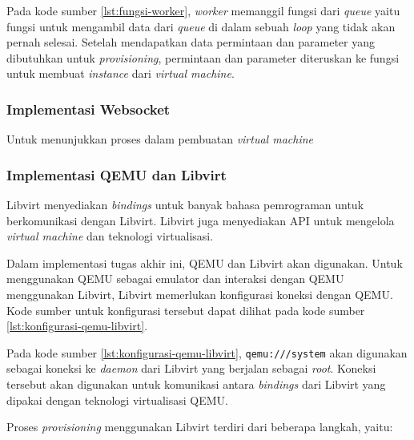 Pada kode sumber \ref{lst:fungsi-worker}, \emph{worker} memanggil fungsi
dari \emph{queue} yaitu fungsi untuk mengambil data dari \emph{queue}
di dalam sebuah \emph{loop} yang tidak akan pernah selesai. Setelah
mendapatkan data permintaan dan parameter yang dibutuhkan untuk \emph{provisioning},
permintaan dan parameter diteruskan ke fungsi untuk membuat \emph{instance}
dari \emph{virtual machine}.

\subsubsection{Implementasi Websocket}
\label{sec:implementasi-websocket}

Untuk menunjukkan proses dalam pembuatan \emph{virtual machine}

\subsubsection{Implementasi QEMU dan Libvirt}
\label{sec:implementasi-libvirt}

Libvirt menyediakan \emph{bindings} untuk banyak bahasa pemrograman
untuk berkomunikasi dengan Libvirt. Libvirt juga menyediakan API untuk
mengelola \emph{virtual machine} dan teknologi virtualisasi.

Dalam implementasi tugas akhir ini, QEMU dan Libvirt akan digunakan.
Untuk menggunakan QEMU sebagai emulator dan interaksi dengan QEMU menggunakan Libvirt,
Libvirt memerlukan konfigurasi koneksi dengan QEMU. Kode sumber untuk konfigurasi
tersebut dapat dilihat pada kode sumber \ref{lst:konfigurasi-qemu-libvirt}.



Pada kode sumber \ref{lst:konfigurasi-qemu-libvirt}, \lstinline{qemu:///system} akan
digunakan sebagai koneksi ke \emph{daemon} dari Libvirt yang berjalan sebagai \emph{root}.
Koneksi tersebut akan digunakan untuk komunikasi antara \emph{bindings} dari Libvirt yang
dipakai dengan teknologi virtualisasi QEMU.

Proses \emph{provisioning} menggunakan Libvirt terdiri dari beberapa langkah, yaitu:

